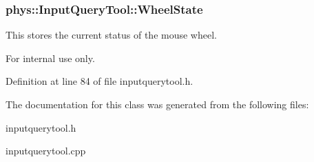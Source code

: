 \hypertarget{classphys_1_1InputQueryTool_af6ceb8ea79ea2fe4b881ce715090fa78}{
\subsubsection[{WheelState}]{ {\bf phys::InputQueryTool::WheelState}}}
\label{da/d96/classphys_1_1InputQueryTool_af6ceb8ea79ea2fe4b881ce715090fa78}


This stores the current status of the mouse wheel. 

\begin{DoxyInternal}{For internal use only.}
\end{DoxyInternal}


Definition at line 84 of file inputquerytool.h.



The documentation for this class was generated from the following files:\begin{DoxyCompactItemize}
\item 
inputquerytool.h\item 
inputquerytool.cpp\end{DoxyCompactItemize}
